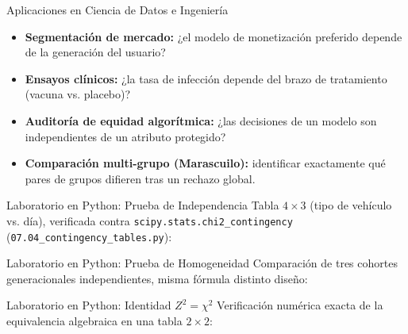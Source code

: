 \documentclass[10pt, aspectratio=169]{beamer}
\begin{document}
\begin{frame}{Aplicaciones en Ciencia de Datos e Ingeniería}
  \footnotesize
  \begin{itemize}\itemsep=0.1cm
    \item \textbf{Segmentación de mercado:} ¿el modelo de monetización preferido depende de la generación del usuario? \pause
    \item \textbf{Ensayos clínicos:} ¿la tasa de infección depende del brazo de tratamiento (vacuna vs. placebo)? \pause
    \item \textbf{Auditoría de equidad algorítmica:} ¿las decisiones de un modelo son independientes de un atributo protegido? \pause
    \item \textbf{Comparación multi-grupo (Marascuilo):} identificar exactamente qué pares de grupos difieren tras un rechazo global.
  \end{itemize}
\end{frame}

\begin{frame}[fragile]{Laboratorio en Python: Prueba de Independencia}
  \scriptsize
  Tabla $4\times3$ (tipo de vehículo vs. día), verificada contra \texttt{scipy.stats.chi2\_contingency} (\texttt{07.04\_contingency\_tables.py}):
  {
  }
\end{frame}

\begin{frame}[fragile]{Laboratorio en Python: Prueba de Homogeneidad}
  \scriptsize
  Comparación de tres cohortes generacionales independientes, misma fórmula distinto diseño:
  {
  }
\end{frame}

\begin{frame}[fragile]{Laboratorio en Python: Identidad $Z^2=\chi^2$}
  \scriptsize
  Verificación numérica exacta de la equivalencia algebraica en una tabla $2\times2$:
  {
  }
\end{frame}
\end{document}
